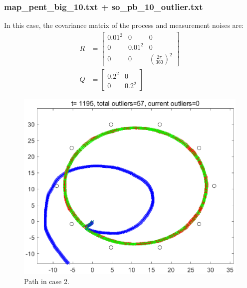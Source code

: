 \documentclass[11pt,a4paper]{article}
\begin{document}
\subsubsection{map\_pent\_big\_10.txt + so\_pb\_10\_outlier.txt}
\par In this case, the covariance matrix of the process and measurement noises are:
\begin{align*}
	R &= \begin{bmatrix} 0 .01^{2} & 0 & 0 \\ 0 & 0.01^{2} & 0 \\ 0 & 0 & (\frac{2\pi}{360})^{2} \end{bmatrix} \\
	Q &= \begin{bmatrix} 0.2^{2} & 0 \\ 0 & 0.2^{2} \end{bmatrix}
\end{align*}
\vspace{2cm}
\begin{figure}[H]
	\centering
	\includegraphics[width=\columnwidth]{Figure/Case_2_Figure_1.eps}
	\caption{Path in case 2.}
	\label{fig:Case_2_Figure_1}
\end{figure}
\end{document}
